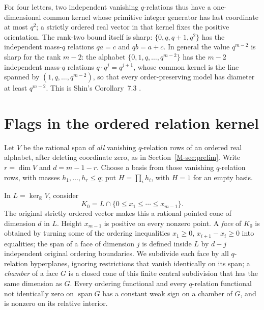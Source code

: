 \documentclass[11pt,reqno]{amsart}
\theoremstyle{plain}
\theoremstyle{definition}
\theoremstyle{plain}
\newcommand{\R}{\mathbb{R}}
\newcommand{\spn}{\operatorname{span}}
\theoremstyle{plain}
\theoremstyle{plain}
\theoremstyle{plain}
\theoremstyle{plain}
\theoremstyle{plain}
\theoremstyle{definition}
\theoremstyle{definition}
\theoremstyle{definition}
\theoremstyle{plain}
\begin{document}
For four letters, two independent vanishing $q$-relations thus have a
one-dimensional common kernel whose primitive integer generator has last
coordinate at most $q^2$; a strictly ordered real vector in that kernel fixes
the positive orientation. The rank-two bound itself is sharp:
$\{0,q,q+1,q^2\}$ has the independent mass-$q$ relations $qa=c$ and
$qb=a+c$. In general the value $q^{m-2}$ is sharp for the rank $m-2$: the
alphabet $\{0,1,q,\ldots,q^{m-2}\}$ has the $m-2$ independent mass-$q$
relations $q\cdot q^{j}=q^{j+1}$, whose common kernel is the line spanned by
$(1,q,\ldots,q^{m-2})$, so that every order-preserving model has diameter at
least $q^{m-2}$. This is Shin's Corollary~7.3 \cite{M-Shin26}.

\section{Flags in the ordered relation kernel}\label{M-sec:flag}

Let $V$ be the rational span of \emph{all} vanishing $q$-relation rows of an
ordered real alphabet, after deleting coordinate zero, as in
Section~\ref{M-sec:prelim}. Write $r=\dim V$ and $d=m-1-r$. Choose a basis
from those vanishing $q$-relation rows, with masses $h_1,\ldots,h_r\le q$;
put $H=\prod_ih_i$, with $H=1$ for an empty basis.

In $L=\ker_{\R}V$, consider
\[
 K_0=L\cap\{0\le x_1\le\cdots\le x_{m-1}\}.
\]
The original strictly ordered vector makes this a rational pointed cone of
dimension $d$ in $L$. Height $x_{m-1}$ is positive on every nonzero point.
A \emph{face} of $K_0$ is obtained by turning some of the ordering
inequalities $x_1\ge0$, $x_{i+1}-x_i\ge0$ into equalities; the span of a face
of dimension $j$ is defined inside $L$ by $d-j$ independent original ordering
boundaries. We subdivide each face by all $q$-relation hyperplanes, ignoring
restrictions that vanish identically on its span; a \emph{chamber} of a face
$G$ is a closed cone of this finite central subdivision that has the same
dimension as $G$. Every ordering functional and every $q$-relation functional
not identically zero on $\spn G$ has a constant weak sign on a chamber of
$G$, and is nonzero on its relative interior.
\end{document}
